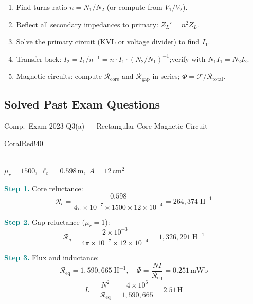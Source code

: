 \documentclass[a4paper, 11pt]{article}
\newcommand{\ans}[1]{\boxed{#1}}
\newcommand{\step}[1]{\par\smallskip\textcolor{Teal}{\textbf{Step #1.}}\enspace}
\begin{document}
\begin{stepsbox}
\begin{enumerate}[noitemsep,topsep=0pt]
  \item Find turns ratio $n=N_1/N_2$ (or compute from $V_1/V_2$).
  \item Reflect all secondary impedances to primary: $Z_L'=n^2 Z_L$.
  \item Solve the primary circuit (KVL or voltage divider) to find $I_1$.
  \item Transfer back: $I_2=I_1/n^{-1}=n\cdot I_1 \cdot (N_2/N_1)^{-1}$;\quad verify with $N_1 I_1=N_2 I_2$.
  \item Magnetic circuits: compute $\mathcal{R}_{\mathrm{core}}$ and $\mathcal{R}_{\mathrm{gap}}$ in series; $\Phi=\mathcal{F}/\mathcal{R}_{\mathrm{total}}$.
\end{enumerate}
\end{stepsbox}

\subsection{Solved Past Exam Questions}

\begin{solvedbox}{Comp.\ Exam 2023 Q3(a) --- Rectangular Core Magnetic Circuit}
\noindent\begin{minipage}[t]{0.40\linewidth}
\vspace{0pt}
\begin{circbox}[CoralBG]{CoralRed!40}
\centering
{}\\[3pt]
{\footnotesize $\mu_r{=}1500$,\ $\ell_c{=}0.598\,\mathrm{m}$,\ $A{=}12\,\mathrm{cm}^2$}
\end{circbox}
\end{minipage}%
\hfill%
\begin{minipage}[t]{0.56\linewidth}
\vspace{0pt}
\step{1} Core reluctance:
\[\mathcal{R}_c=\frac{0.598}{4\pi{\times}10^{-7}{\times}1500{\times}12{\times}10^{-4}}=\ans{264{,}374\;\mathrm{H}^{-1}}\]
\step{2} Gap reluctance ($\mu_r{=}1$):
\[\mathcal{R}_g=\frac{2{\times}10^{-3}}{4\pi{\times}10^{-7}{\times}12{\times}10^{-4}}=\ans{1{,}326{,}291\;\mathrm{H}^{-1}}\]
\step{3} Flux and inductance:
\[\mathcal{R}_{\mathrm{eq}}=\ans{1{,}590{,}665\;\mathrm{H}^{-1}},\quad\Phi=\frac{NI}{\mathcal{R}_{\mathrm{eq}}}=\ans{0.251\,\mathrm{mWb}}\]
\[L=\frac{N^2}{\mathcal{R}_{\mathrm{eq}}}=\frac{4{\times}10^6}{1{,}590{,}665}=\ans{2.51\,\mathrm{H}}\]
\end{minipage}
\end{solvedbox}
\end{document}
